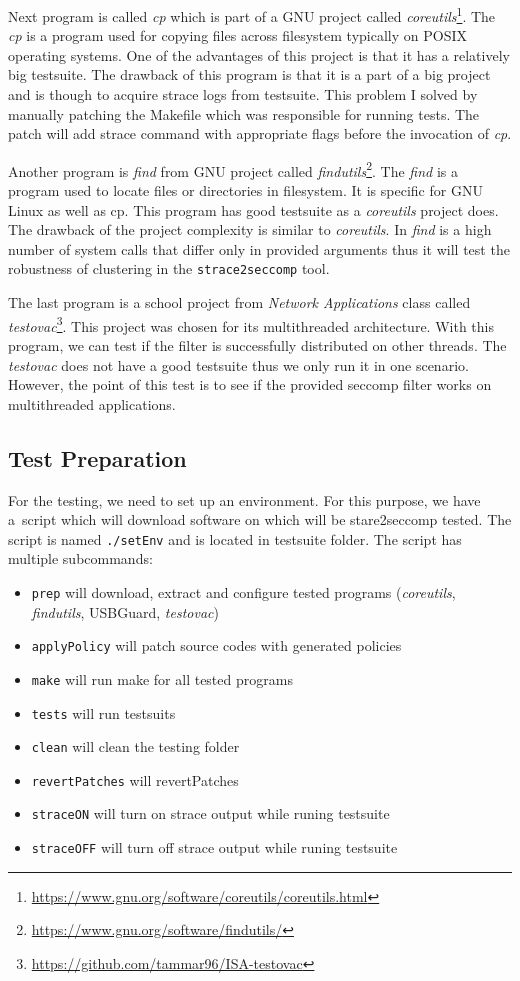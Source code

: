 Next program is called \emph{cp} which is part of a GNU project called
\emph{coreutils}\footnote{\url{https://www.gnu.org/software/coreutils/coreutils.html}}.
The \emph{cp} is a program used for copying files across filesystem typically on
POSIX operating systems. One of the advantages of this project is that it has a
relatively big testsuite. The drawback of this program is that it is a part of a
big project and is though to acquire strace logs from testsuite. This problem I
solved by manually patching the Makefile which was responsible for running
tests. The patch will add strace command with appropriate flags before the
invocation of \emph{cp}.

Another program is \emph{find} from GNU project called
\emph{findutils}\footnote{\url{https://www.gnu.org/software/findutils/}}. The
\emph{find} is a program used to locate files or directories in filesystem. It
is specific for GNU Linux as well as cp. This program has good testsuite as a
\emph{coreutils} project does. The drawback of the project complexity is similar to
\emph{coreutils}. In \emph{find} is a high number of system calls that differ
only in provided arguments thus it will test the robustness of clustering in the
\texttt{strace2seccomp} tool.

The last program is a school project from \emph{Network Applications} class called
\emph{testovac}\footnote{\url{https://github.com/tammar96/ISA-testovac}}. This
project was chosen for its multithreaded architecture. With this program, we can
test if the filter is successfully distributed on other threads. The
\emph{testovac} does not have a good testsuite thus we only run it in one
scenario. However, the point of this test is to see if the provided seccomp
filter works on multithreaded applications.

\subsection{Test Preparation}
For the testing, we need to set up an environment. For this purpose, we have
a~script which will download software on which will be stare2seccomp tested. The
script is named \texttt{./setEnv} and is located in testsuite folder.
The script has multiple subcommands:
\begin{itemize}
	\item \texttt{prep} will download, extract and configure tested programs
		(\emph{coreutils}, \emph{findutils}, USBGuard, \emph{testovac})
	\item \texttt{applyPolicy} will patch source codes with generated policies
	\item \texttt{make} will run make for all tested programs
	\item \texttt{tests} will run testsuits
	\item \texttt{clean} will clean the testing folder
	\item \texttt{revertPatches} will revertPatches
	\item \texttt{straceON} will turn on strace output while runing testsuite
	\item \texttt{straceOFF} will turn off strace output while runing testsuite
\end{itemize}

